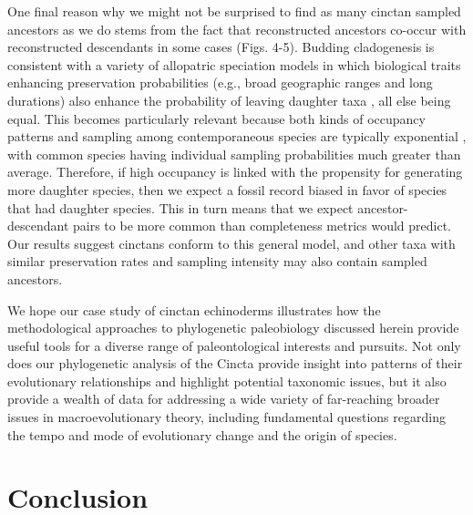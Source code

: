 \documentclass{article}
\begin{document}
One final reason why we might not be surprised to find as many cinctan sampled ancestors as we do stems from the fact that reconstructed ancestors co-occur with reconstructed descendants in some cases (Figs. 4-5).  Budding cladogenesis is consistent with a variety of allopatric speciation models in which biological traits enhancing preservation probabilities (e.g., broad geographic ranges and long durations) also enhance the probability of leaving daughter taxa \citep{WagnerErwin1995}, all else being equal. This becomes particularly relevant because both kinds of occupancy patterns and sampling among contemporaneous species are typically exponential \citep{Liow2013,WagnerMarcot2013,Foote2016}, with common species having individual sampling probabilities much greater than average. Therefore, if high occupancy is linked with the propensity for generating more daughter species, then we expect a fossil record biased in favor of species that had daughter species.  This in turn means that we expect ancestor-descendant pairs to be more common than completeness metrics would predict.  Our results suggest cinctans conform to this general model, and other taxa with similar preservation rates and sampling intensity may also contain sampled ancestors. 

We hope our case study of cinctan echinoderms illustrates how the methodological approaches to phylogenetic paleobiology discussed herein provide useful tools for a diverse range of paleontological interests and pursuits. 
Not only does our phylogenetic analysis of the Cincta provide insight into patterns of their evolutionary relationships and highlight potential taxonomic issues, but it also provide a wealth of data for addressing a wide variety of far-reaching broader issues in macroevolutionary theory, including fundamental questions regarding the tempo and mode of evolutionary change and the origin of species.




\section{Conclusion}
\end{document}
